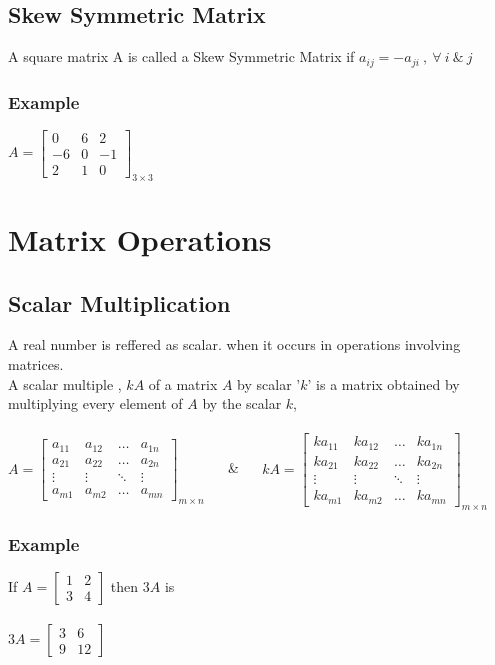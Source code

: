 \documentclass{article}
\begin{document}
	\subsection{Skew Symmetric Matrix}
	A square matrix A is called a Skew Symmetric Matrix if $ a_{ij} = -a_{ji} ~,~ \forall ~ i ~ \& ~ j $
	
	\subsubsection{Example}
	$ A = { \left[ \begin{array}{ccc}
		0 & 6 & 2 \\
		-6 & 0 & -1 \\
		2 & 1 & 0
	\end{array}\right] }_{3 \times 3} $
	
	\section{Matrix Operations}
	\subsection{Scalar Multiplication}
	A real number is reffered as scalar. when it occurs in operations involving matrices. \\
	A scalar multiple , $ kA $ of a matrix $ A $ by scalar '$ k $' is a matrix obtained by multiplying every element of $ A $ by the scalar $ k $, \\ \\
	$ A = { \left[ \begin{array}{cccc}
		a_{11} & a_{12} & \dots & a_{1n} \\
		a_{21} & a_{22} & \dots & a_{2n} \\
		\vdots & \vdots & \ddots & \vdots \\
		a_{m1} & a_{m2} & \dots & a_{mn}
	\end{array}\right] }_{m \times n} $
	~~ \& ~~
	$ kA = { \left[ \begin{array}{cccc}
			ka_{11} & ka_{12} & \dots & ka_{1n} \\
			ka_{21} & ka_{22} & \dots & ka_{2n} \\
			\vdots  & \vdots & 	\ddots & \vdots \\
			ka_{m1} & ka_{m2} & \dots & ka_{mn}
		\end{array}\right]}_{m \times n} $
	
	\subsubsection{Example}
	If $ A = \left[ \begin{array}{cc}
		1 & 2 \\
		3 & 4
	\end{array} \right] $
	then $ 3A $ is \\ \\
	$ 3A = \left[ \begin{array}{cc}
		3 & 6 \\
		9 & 12
	\end{array}\right] $
	
\end{document}
